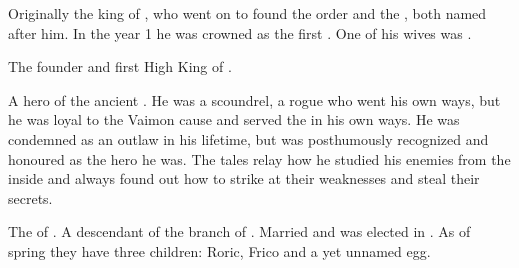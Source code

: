 \begin{gloss}
\begin{comment}
\paragraph{Cordos Vaimon}
\end{comment}
Originally the king of {\Imrath}, who went on to found the  order and the , both named after him. 
In the year 1 \VC{} he was crowned as the first \VaimonCaliph. One of his wives was . 







\begin{comment}
\paragraph{Cuthran the Victorious}
\end{comment}
The founder and first High King of . 







\begin{comment}
\paragraph{Grith Ecallivan}
\end{comment}
A hero of the ancient . 
He was a scoundrel, a rogue who went his own ways, but he was loyal to the Vaimon cause and served the \caliphate in his own ways. 
He was condemned as an outlaw in his lifetime, but was posthumously recognized and honoured as the hero he was. 
The tales relay how he studied his enemies from the inside and always found out how to strike at their weaknesses and steal their secrets. 







\begin{comment}
\paragraph{\Icor{} Pelidor}
\end{comment}
The \rayuth of . 
A descendant of the \Malcuric{} branch of . 
Married  and was elected \rayuth in . 
As of spring  they have three children: Roric, Frico and a yet unnamed egg. 








\end{gloss}
